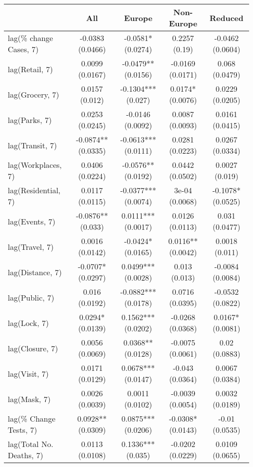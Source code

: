 \begin{table}[ht]
\centering
\begingroup\small
\begin{tabular}{lcccc}
  \toprule
 & All & Europe & Non-Europe & Reduced \\ 
  \midrule
lag(\% change Cases, 7) & -0.0383 (0.0466) & -0.0581* (0.0274) & 0.2257 (0.19) & -0.0462 (0.0604) \\ 
  lag(Retail, 7) & 0.0099 (0.0167) & -0.0479** (0.0156) & -0.0169 (0.0171) & 0.068 (0.0479) \\ 
  lag(Grocery, 7) & 0.0157 (0.012) & -0.1304*** (0.027) & 0.0174* (0.0076) & 0.0229 (0.0205) \\ 
  lag(Parks, 7) & 0.0253 (0.0245) & -0.0146 (0.0092) & 0.0087 (0.0093) & 0.0161 (0.0415) \\ 
  lag(Transit, 7) & -0.0874** (0.0335) & -0.0613*** (0.0111) & 0.0281 (0.0223) & 0.0267 (0.0334) \\ 
  lag(Workplaces, 7) & 0.0406 (0.0224) & -0.0576** (0.0192) & 0.0442 (0.0502) & 0.0027 (0.019) \\ 
  lag(Residential, 7) & 0.0117 (0.0115) & -0.0377*** (0.0074) & 3e-04 (0.0068) & -0.1078* (0.0525) \\ 
  lag(Events, 7) & -0.0876** (0.033) & 0.0111*** (0.0017) & 0.0126 (0.0113) & 0.031 (0.0477) \\ 
  lag(Travel, 7) & 0.0016 (0.0142) & -0.0424* (0.0165) & 0.0116** (0.0042) & 0.0018 (0.011) \\ 
  lag(Distance, 7) & -0.0707* (0.0297) & 0.0499*** (0.0028) & 0.013 (0.013) & -0.0084 (0.0084) \\ 
  lag(Public, 7) & 0.016 (0.0192) & -0.0882*** (0.0178) & 0.0716 (0.0395) & -0.0532 (0.0822) \\ 
  lag(Lock, 7) & 0.0294* (0.0139) & 0.1562*** (0.0202) & -0.0268 (0.0368) & 0.0167* (0.0081) \\ 
  lag(Closure, 7) & 0.0056 (0.0069) & 0.0368** (0.0128) & -0.0075 (0.0061) & 0.02 (0.0883) \\ 
  lag(Visit, 7) & 0.0171 (0.0129) & 0.0678*** (0.0147) & -0.043 (0.0364) & 0.0067 (0.0384) \\ 
  lag(Mask, 7) & 0.0026 (0.0039) & 0.0011 (0.0102) & -0.0039 (0.0054) & 0.0032 (0.0189) \\ 
  lag(\% Change Tests, 7) & 0.0928** (0.0309) & 0.0875*** (0.0206) & -0.0308* (0.0143) & -0.01 (0.0535) \\ 
  lag(Total No. Deaths, 7) & 0.0113 (0.0108) & 0.1336*** (0.035) & -0.0202 (0.0229) & 0.0109 (0.0655) \\ 

\end{tabular}
\end{table}
